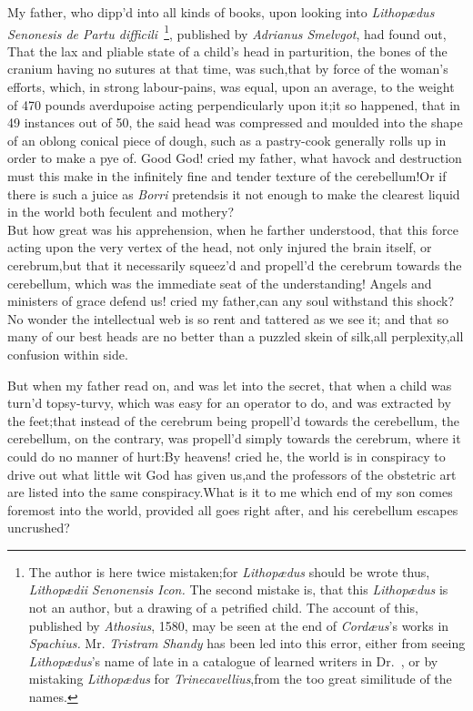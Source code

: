 \documentclass{article}
\begin{document}
My father, who dipp’d into all kinds of books, upon looking into \textit{Lithopædus
Senonesis de Partu difficili}\ \footnote{\fontsize{8}{11}\selectfont\quad 
The author is here twice mistaken;\tsh for \textit{Lithopædus} should be wrote thus,
\textit{Lithopædii Seno\-nensis Icon.} The second mistake is, that this
\textit{Li\-thopædus} is not an author, but a drawing of a petrified child. The
account of this, published by \textit{Athosius}, 1580, may be seen at the end of
\textit{Cordæus}’s works in \textit{Spachius.} Mr.  \textit{Tristram Shandy} has
been led into this error, either from seeing \textit{Lithopædus}’s name of late in a
catalogue of learned writers in \hbox{Dr. \tsh}, or by mistaking \textit{Lithopædus}
for \textit{Trinecavellius},\tsk from the too great similitude of the names.},
published by
\textit{Adrianus Smelvgot}, had found out, That\break
the lax and pliable state of a child’s\break
head in parturition, the bones of the\break
cranium having no sutures at that time,\break
was such,\tsk that by force of the woman’s\break
efforts, which, in strong labour-pains,\break
was equal, upon an average, to the
weight of 470 pounds averdupoise acting perpendicularly upon it;\tsk it so happened,
that in 49 instances out of 50, the said head was compressed and moulded into the
shape of an oblong conical piece of dough, such as a pastry-cook generally rolls up
in order to make a pye of.\tsh\break
Good God!  cried my father, what havock and destruction
must this make in the infinitely fine and tender texture of the cerebellum!\tsk Or if
there is such a juice as \textit{Borri} pretends\tsk is it not enough to make the
clearest liquid in the world both feculent and
mothery?\\
\newpage
But how great was his apprehension, when he farther understood,
that this force acting upon the very vertex of the head, not only
injured the brain itself, or cerebrum,\tsk but that it
necessarily squeez’d and propell’d the cerebrum towards the
cerebellum, which was the immediate seat of the
understanding!\tsh\break
Angels and ministers of grace defend
us! cried my father,\tsk can any soul withstand this
shock?\tsk No wonder the intellectual web is so rent and tattered
as we see it; and that so many of our best heads are no better than
a puzzled skein of silk,\tsk all
perplexity,\tsk all confusion within side.

But when my father read on, and was let into the secret, that
when a child was turn’d topsy-turvy, which was easy for an operator
to do, and was extracted by the feet;\tsk that instead of the
cerebrum being propell’d towards the cerebellum, the cerebellum, on
the contrary, was propell’d simply towards the cerebrum, where it could
do no manner of hurt:\tsh By heavens! cried he, the world
is in conspiracy to drive out what little wit God has given
us,\tsk and the professors of the obstetric art are listed
into the same conspiracy.\tsk What is it to me which end of my
son comes foremost into the world, provided all goes right after,
and his cerebellum escapes uncrushed?
\end{document}
